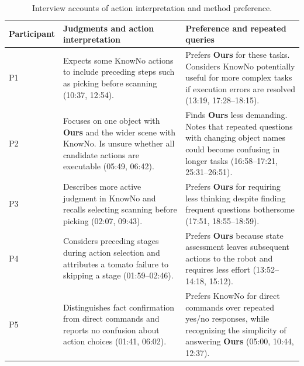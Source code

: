 \begin{table}[!htbp]
\centering
\caption{Interview accounts of action interpretation and method preference.}
\label{tab:app_interview_summary}
\small
\setlength{\tabcolsep}{5pt}
\renewcommand{\arraystretch}{1.12}
\begin{tabularx}{\textwidth}{@{}l>{\raggedright\arraybackslash}X>{\raggedright\arraybackslash}X@{}}
\toprule
Participant & Judgments and action interpretation & Preference and repeated queries \\
\midrule
P1 & Expects some KnowNo actions to include preceding steps such as picking before scanning (10:37, 12:54). & Prefers \textbf{Ours} for these tasks. Considers KnowNo potentially useful for more complex tasks if execution errors are resolved (13:19, 17:28--18:15). \\
\addlinespace
P2 & Focuses on one object with \textbf{Ours} and the wider scene with KnowNo. Is unsure whether all candidate actions are executable (05:49, 06:42). & Finds \textbf{Ours} less demanding. Notes that repeated questions with changing object names could become confusing in longer tasks (16:58--17:21, 25:31--26:51). \\
\addlinespace
P3 & Describes more active judgment in KnowNo and recalls selecting scanning before picking (02:07, 09:43). & Prefers \textbf{Ours} for requiring less thinking despite finding frequent questions bothersome (17:51, 18:55--18:59). \\
\addlinespace
P4 & Considers preceding stages during action selection and attributes a tomato failure to skipping a stage (01:59--02:46). & Prefers \textbf{Ours} because state assessment leaves subsequent actions to the robot and requires less effort (13:52--14:18, 15:12). \\
\addlinespace
P5 & Distinguishes fact confirmation from direct commands and reports no confusion about action choices (01:41, 06:02). & Prefers KnowNo for direct commands over repeated yes/no responses, while recognizing the simplicity of answering \textbf{Ours} (05:00, 10:44, 12:37). \\
\bottomrule
\end{tabularx}
\end{table}

